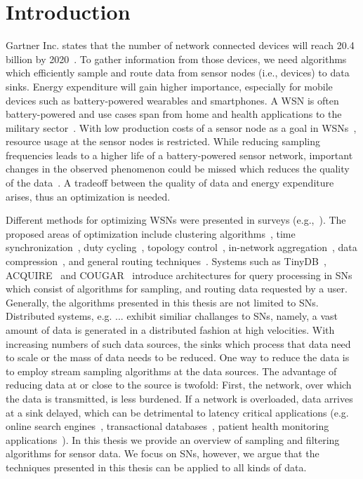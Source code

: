 \section{Introduction}
\label{sec:Introduction}
Gartner Inc. states that the number of network connected devices will reach
20.4 billion by 2020~\cite{gartner}. To gather information from those devices,
we need algorithms which efficiently sample and route data from sensor nodes
(i.e., devices) to data sinks. Energy expenditure will gain higher importance,
especially for mobile devices such as battery-powered wearables and
smartphones. A \ac{WSN} is often battery-powered and use cases span from home
and health applications to the military sector~\cite{akyildiz2002wireless}.
With low production costs of a sensor node as a goal in
\acp{WSN}~\cite{akyildiz2002wireless}, resource usage at the sensor nodes is
restricted. While reducing sampling frequencies leads to a higher life of a
battery-powered sensor network, important changes in the observed phenomenon
could be missed which reduces the quality of the
data~\cite{akyildiz2002wireless}. A tradeoff between the quality of data and
energy expenditure arises, thus an optimization is needed. 
\par
Different methods for optimizing \acp{WSN} were presented in surveys
(e.g.,~\cite{abbasi2007survey, sivrikaya2004time, carrano2014survey}). The
proposed areas of optimization include clustering
algorithms~\cite{abbasi2007survey}, time
synchronization~\cite{sivrikaya2004time}, duty
cycling~\cite{carrano2014survey}, topology control~\cite{li2013survey},
in-network aggregation~\cite{fasolo2007network}, data
compression~\cite{srisooksai2012practical}, and general routing
techniques~\cite{al2004routing, kulkarni2011particle, singh2015survey,
rault2014energy}. Systems such as TinyDB~\cite{madden2005tinydb},
ACQUIRE~\cite{sadagopan2003acquire} and COUGAR~\cite{yao2002cougar} introduce
architectures for query processing in \acp{SN} which consist of algorithms for
sampling, and routing data requested by a user. Generally, the algorithms
presented in this thesis are not limited to \acp{SN}. Distributed systems, e.g.
... exhibit similiar challanges to \acp{SN}, namely, a vast amount of data is
generated in a distributed fashion at high velocities. With increasing numbers
of such data sources, the sinks which process that data need to scale or the
mass of data needs to be reduced. One way to reduce the data is to employ
stream sampling algorithms at the data sources. The advantage of reducing data
at or close to the source is twofold: First, the network, over which the data
is transmitted, is less burdened. If a network is overloaded, data arrives at a
sink delayed, which can be detrimental to latency critical applications (e.g.
online search engines~\cite{kasture2016tailbench}, transactional
databases~\cite{kasture2016tailbench}, patient health monitoring
applications~\cite{abdullah2015real}). In this thesis we provide an overview of
sampling and filtering algorithms for sensor data. We focus on \acp{SN},
however, we argue that the techniques presented in this thesis can be applied
to all kinds of data. 


